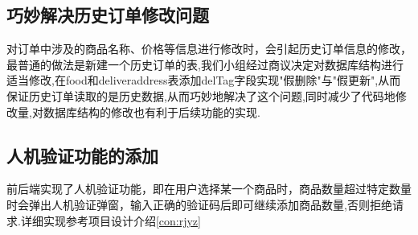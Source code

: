 \subsection{巧妙解决历史订单修改问题}\label{con:6.03}
对订单中涉及的商品名称、价格等信息进行修改时，会引起历史订单信息的修改，最普通的做法是新建一个历史订单的表,我们小组经过商议决定对数据库结构进行适当修改,在food和deliveraddress表添加delTag字段实现"假删除"与"假更新",从而保证历史订单读取的是历史数据,从而巧妙地解决了这个问题,同时减少了代码地修改量,对数据库结构的修改也有利于后续功能的实现.
\subsection{人机验证功能的添加}
前后端实现了人机验证功能，即在用户选择某一个商品时，商品数量超过特定数量时会弹出人机验证弹窗，输入正确的验证码后即可继续添加商品数量,否则拒绝请求.详细实现参考项目设计介绍\ref{con:rjyz}

